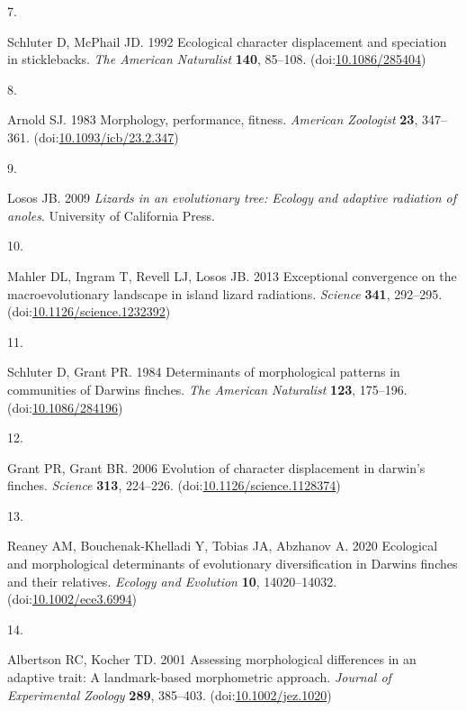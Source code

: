 \documentclass[
  11pt,
]{article}
\newlength{\cslhangindent}
\newlength{\csllabelwidth}
\newlength{\cslentryspacingunit} %
\newenvironment{CSLReferences}[2] %
 {%
  \setlength{\parindent}{0pt}
  \ifodd #1
  \let\oldpar\par
  \def\par{\hangindent=\cslhangindent\oldpar}
  \fi
  \setlength{\parskip}{#2\cslentryspacingunit}
 }%
 {}
\newcommand{\CSLLeftMargin}[1]{\parbox[t]{\csllabelwidth}{#1}}
\newcommand{\CSLRightInline}[1]{\parbox[t]{\linewidth - \csllabelwidth}{#1}\break}
\begin{document}
\begin{CSLReferences}{0}{0}
\leavevmode{}%
\CSLLeftMargin{7. }%
\CSLRightInline{Schluter D, McPhail JD. 1992 Ecological character
displacement and speciation in sticklebacks. \emph{The American
Naturalist} \textbf{140}, 85--108.
(doi:\href{https://doi.org/10.1086/285404}{10.1086/285404})}

\leavevmode{}%
\CSLLeftMargin{8. }%
\CSLRightInline{Arnold SJ. 1983 Morphology, performance, fitness.
\emph{American Zoologist} \textbf{23}, 347--361.
(doi:\href{https://doi.org/10.1093/icb/23.2.347}{10.1093/icb/23.2.347})}

\leavevmode{}%
\CSLLeftMargin{9. }%
\CSLRightInline{Losos JB. 2009 \emph{Lizards in an evolutionary tree:
Ecology and adaptive radiation of anoles}. University of California
Press. }

\leavevmode{}%
\CSLLeftMargin{10. }%
\CSLRightInline{Mahler DL, Ingram T, Revell LJ, Losos JB. 2013
Exceptional convergence on the macroevolutionary landscape in island
lizard radiations. \emph{Science} \textbf{341}, 292--295.
(doi:\href{https://doi.org/10.1126/science.1232392}{10.1126/science.1232392})}

\leavevmode{}%
\CSLLeftMargin{11. }%
\CSLRightInline{Schluter D, Grant PR. 1984 Determinants of morphological
patterns in communities of {D}arwin{\textquotesingle}s finches.
\emph{The American Naturalist} \textbf{123}, 175--196.
(doi:\href{https://doi.org/10.1086/284196}{10.1086/284196})}

\leavevmode{}%
\CSLLeftMargin{12. }%
\CSLRightInline{Grant PR, Grant BR. 2006 Evolution of character
displacement in darwin's finches. \emph{Science} \textbf{313}, 224--226.
(doi:\href{https://doi.org/10.1126/science.1128374}{10.1126/science.1128374})}

\leavevmode{}%
\CSLLeftMargin{13. }%
\CSLRightInline{Reaney AM, Bouchenak-Khelladi Y, Tobias JA, Abzhanov A.
2020 Ecological and morphological determinants of evolutionary
diversification in {D}arwin{\textquotesingle}s finches and their
relatives. \emph{Ecology and Evolution} \textbf{10}, 14020--14032.
(doi:\href{https://doi.org/10.1002/ece3.6994}{10.1002/ece3.6994})}

\leavevmode{}%
\CSLLeftMargin{14. }%
\CSLRightInline{Albertson RC, Kocher TD. 2001 Assessing morphological
differences in an adaptive trait: A landmark-based morphometric
approach. \emph{Journal of Experimental Zoology} \textbf{289}, 385--403.
(doi:\href{https://doi.org/10.1002/jez.1020}{10.1002/jez.1020})}


\end{CSLReferences}
\end{document}
